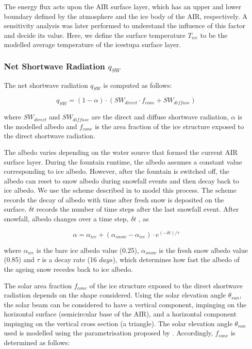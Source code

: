 \documentclass[utf8]{frontiersSCNS}
\begin{document}
The energy flux acts upon the AIR surface layer, which has an upper and lower boundary defined by the
atmosphere and the ice body of the AIR, respectively.  A sensitivity analysis was later performed
to understand the influence of this factor and decide its value. Here, we define the surface temperature
$T_{ice}$ to be the modelled average temperature of the icestupa surface layer.

\subsubsection{Net Shortwave Radiation \texorpdfstring{$q_{SW}$}{Lg}} \label{sec:SW}

The net shortwave radiation $q_{SW}$ is computed as follows:

\begin{equation} q_{SW} = (1- \alpha)\cdot (SW_{direct} \cdot f_{cone} + SW_{diffuse}) \label{eqn:SW} \end{equation}

where $SW_{direct}$ and $SW_{diffuse}$ are the direct and diffuse shortwave radiation, $\alpha$ is the
modelled albedo and $f_{cone}$ is the area fraction of the ice structure exposed to the direct shortwave
radiation.

The albedo varies depending on the water source that formed the current AIR surface layer. During the fountain
runtime, the albedo assumes a constant value corresponding to ice albedo. However, after the fountain is
switched off, the albedo can reset to snow albedo during snowfall events and then decay back to ice albedo. We
use the scheme described in \cite{OerlemansKnap_1998} to model this process. The scheme records the decay of
albedo with time after fresh snow is deposited on the surface. $\delta t$ records the number of time steps after
the last snowfall event. After snowfall, albedo changes over a time step, $\delta t$ , as

\begin{equation} \alpha=\alpha_{ice}+(\alpha_{snow}-\alpha_{ice}) \cdot e^{(-\delta t)/\tau} \label{eqn:a}
\end{equation}

where $\alpha_{ice}$ is the bare ice albedo value (0.25), $\alpha_{snow}$ is the fresh snow albedo value (0.85)
and $\tau$ is a decay rate (16 $days$), which determines how fast the albedo of the ageing snow recedes back to ice albedo.

The solar area fraction $f_{cone}$ of the ice structure exposed to the direct shortwave radiation depends on the shape
considered. Using the solar elevation angle $\theta_{sun}$, the solar beam can be considered to have a vertical
component, impinging on the horizontal surface (semicircular base of the AIR), and a horizontal component
impinging on the vertical cross section (a triangle). The solar elevation angle $\theta_{sun}$ used is modelled
using the parametrisation proposed by \cite{Woolf_1968}. Accordingly, $f_{cone}$ is determined as follows:
\end{document}

